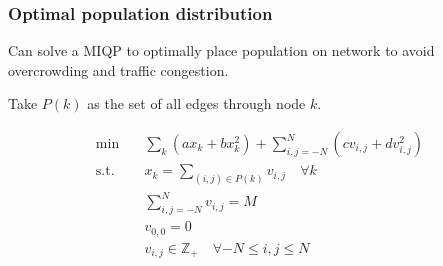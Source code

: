 \documentclass[11pt]{beamer}
\begin{document}
\begin{frame}
\frametitle{Optimal population distribution}

Can solve a MIQP to optimally place population on network to avoid overcrowding and traffic congestion.

Take $P(k)$ as the set of all edges through node $k$.

\begin{align*}
	\min\quad& \sum_{k} \left(ax_k + bx_k^2\right) + \sum_{i,j=-N}^N \left(c v_{i,j} + d v_{i,j}^2\right) \\
	\text{s.t.}\quad& x_k = \sum_{(i,j) \in P(k)} v_{i,j} \quad \forall k \\
	& \sum_{i,j = -N}^N v_{i,j} = M \\
	& v_{0,0} = 0 \\
	& v_{i,j} \in \mathbb{Z}_+ \quad \forall -N \leq i,j \leq N
\end{align*}

\end{frame}
\end{document}
